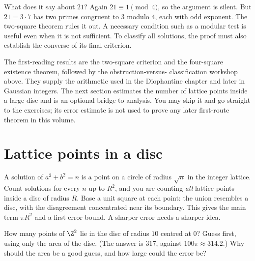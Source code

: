What does it say about $21$? Again $21\equiv1\pmod4$,
so the argument is silent. But $21=3\cdot7$ has two
primes congruent to $3$ modulo $4$, each with odd
exponent. The two-square theorem rules it out.
A necessary condition such as a modular test is
useful even when it is not sufficient. To classify
all solutions, the proof must also establish the
converse of its final criterion.

\begin{reminder}
The first-reading results are the two-square criterion and the
four-square existence theorem, followed by the obstruction-versus-
classification workshop above. They supply the arithmetic used in the
Diophantine chapter and later in Gaussian integers.
The next section estimates the number of lattice points inside a
large disc and is an optional bridge to analysis. You may skip it and
go straight to the exercises; its error estimate is not used to prove
any later first-route theorem in this volume.
\end{reminder}

\section{Lattice points in a disc}

A solution of $a^2+b^2=n$ is a point on a circle of radius $\sqrt n$ in the integer lattice. Count solutions for every $n$ up to $R^2$, and you are counting \emph{all} lattice points inside a disc of radius $R$. Base a unit square at each point: the union resembles a disc, with the disagreement concentrated near its boundary. This gives the main term $\pi R^2$ and a first error bound. A sharper error needs a sharper idea.

\begin{think}
How many points of $\Z^2$ lie in the disc of radius $10$ centred at $0$? Guess first, using only the area of the disc. (The answer is $317$, against $100\pi\approx314.2$.) Why should the area be a good guess, and how large could the error be?
\end{think}

